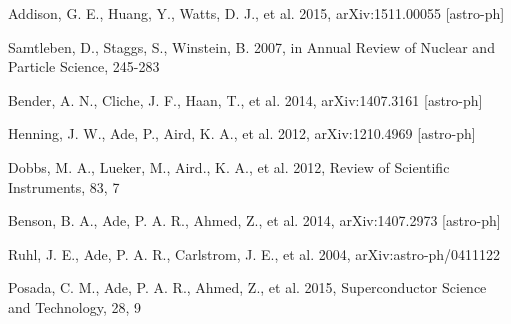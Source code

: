 \documentclass[iop]{emulateapj}
\begin{document}
%
\begin{thebibliography}{dummy}
Addison, G. E., Huang, Y., Watts, D. J., et al. 2015, {arXiv:1511.00055 [astro-ph]}

Samtleben, D., Staggs, S., Winstein, B. 2007, in Annual Review of Nuclear and Particle Science, 245-283

Bender, A. N., Cliche, J. F., Haan, T., et al. 2014, {arXiv:1407.3161 [astro-ph]}

Henning, J. W., Ade, P., Aird, K. A., et al. 2012, {arXiv:1210.4969 [astro-ph]}

Dobbs, M. A., Lueker, M., Aird., K. A., et al. 2012, Review of Scientific Instruments, 83, 7

Benson, B. A., Ade, P. A. R., Ahmed, Z., et al. 2014, {arXiv:1407.2973 [astro-ph]}

Ruhl, J. E., Ade, P. A. R., Carlstrom, J. E., et al. 2004, {arXiv:astro-ph/0411122}

Posada, C. M., Ade, P. A. R., Ahmed, Z., et al. 2015, Superconductor Science and Technology, 28, 9

\end{thebibliography}
\end{document}
